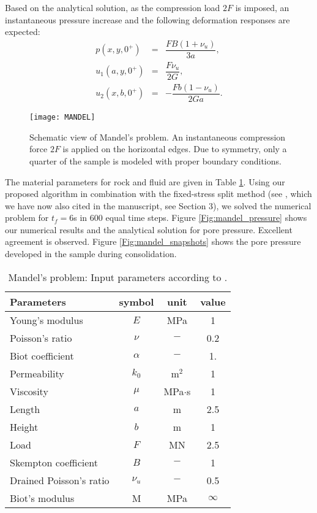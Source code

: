 Based on the analytical solution, as the compression load $2F$ is imposed, an instantaneous pressure increase and the following deformation responses are expected:	
\begin{eqnarray*}
	p(x, y, 0^+) &=&\dfrac{FB(1+\nu_u)}{3a},\\
	u_1(a, y, 0^+) &=&\dfrac{F\nu_u}{2G},\\
	u_2(x, b, 0^+) &=&-\dfrac{Fb(1-\nu_u)}{2Ga}.
\end{eqnarray*}
\begin{figure}[htbp]
	\centering
	\texttt{[image: MANDEL]}
	\caption{Schematic view of Mandel's problem. An instantaneous compression force $2F$ is applied on the horizontal edges. Due to symmetry, only a quarter of the sample is modeled with proper boundary conditions.}
	\label{Fig:mandel}
\end{figure}
The material parameters for rock and fluid are given in Table \ref{Tab:Mandel_input}. Using our proposed algorithm in combination with the fixed-stress split method (see \cite{chukwudozie2016application, mikelic2013convergence}, which we have now also cited in the manuscript, see Section 3), we solved the numerical problem for $t_f=6$s in 600 equal time steps. Figure \ref{Fig:mandel_pressure} shows our numerical results and the analytical solution for pore pressure. Excellent agreement is observed. Figure \ref{Fig:mandel_snapshots} shows the pore pressure developed in the sample during consolidation.
\begin{table}[htbp]
	\centering
	\caption{Mandel's problem: Input parameters according to \cite{chukwudozie2016application}.}
	\begin{tabular}{l c c c}
		\hline 
		Parameters & symbol & unit& value \\
		\hline 
		Young's modulus & $E$ &MPa&  1\\
		Poisson's ratio & $\nu$ &$-$&  0.2\\
		Biot coefficient & $\alpha$ &$-$&  1.\\
		Permeability & $k_0$ &m$^2$&  1\\
		Viscosity &$\mu$ & MPa$\cdot$s &  1\\
		Length & $a$ & m &  2.5\\
		Height & $b$ & m &  1\\
		Load&$F$& MN& 2.5\\     
		Skempton coefficient &$B$& $-$& 1\\                    
		Drained Poisson's ratio&$\nu_u$& $-$&  0.5\\      
		Biot's modulus  & M & MPa & $\infty$ \\                                               
		\hline      
	\end{tabular}
	\label{Tab:Mandel_input}
\end{table}
